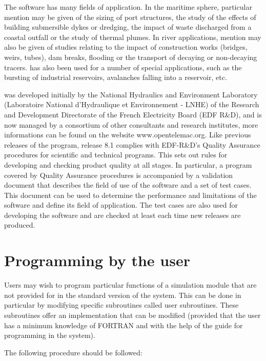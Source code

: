 The software has many fields of application.
In the maritime sphere, particular mention may be given of the sizing of port
structures, the study of the effects of building submersible dykes or dredging,
the impact of waste discharged from a coastal outfall or the study of thermal
plumes.
In river applications, mention may also be given of studies relating to the impact
of construction works (bridges, weirs, tubes), dam breaks,
flooding or the transport of decaying or non-decaying tracers.
 has also been used for a number of special applications,
such as the bursting of industrial reservoirs, avalanches falling
into a reservoir, etc.

 was developed initially by the National Hydraulics and Environment
Laboratory (Laboratoire National d'Hydraulique et Environnement - LNHE)
of the Research and Development Directorate of the French Electricity Board
(EDF R\&D), and is now managed by a consortium
of other consultants and research institutes, more informations can be found
on the website www.opentelemac.org.
Like previous releases of the program, release 8.1 complies with EDF-R\&D's
Quality Assurance procedures for scientific and technical programs.
This sets out rules for developing and checking product quality at all stages.
In particular, a program covered by Quality Assurance procedures is accompanied
by a validation document that describes the field of use of the software
and a set of test cases.
This document can be used to determine the performance and limitations of the
software and define its field of application.
The test cases are also used for developing the software
and are checked at least each time new releases are produced.


\section{Programming by the user}

Users may wish to program particular functions of a simulation module
that are not provided for in the standard version of the \tel system.
This can be done in particular by modifying specific subroutines called user
subroutines.
These subroutines offer an implementation that can be modified
(provided that the user has a minimum knowledge of FORTRAN and with the help
of the guide for programming in the \tel system).

The following procedure should be followed:

